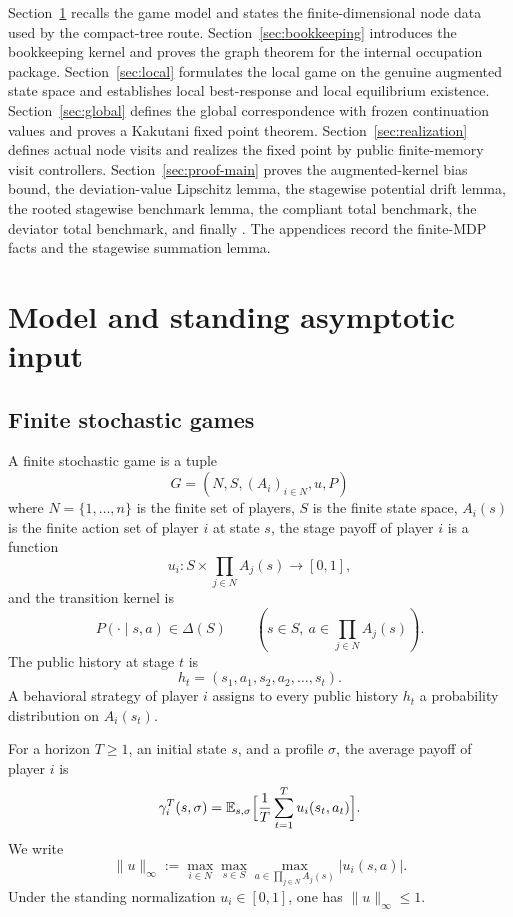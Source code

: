 \documentclass[12pt]{article}
\theoremstyle{definition}
\newcommand{\E}{\mathbb{E}}
\newcommand{\1}{\mathbf{1}}
\begin{document}
Section~\ref{sec:model} recalls the game model and states the finite-dimensional
node data used by the compact-tree route. Section~\ref{sec:bookkeeping}
introduces the bookkeeping kernel and proves the graph theorem for the internal
occupation package. Section~\ref{sec:local} formulates the local game on the
genuine augmented state space and establishes local best-response and local
equilibrium existence. Section~\ref{sec:global} defines the global correspondence
with frozen continuation values and proves a Kakutani fixed point theorem.
Section~\ref{sec:realization} defines actual node visits and realizes the fixed
point by public finite-memory visit controllers. Section~\ref{sec:proof-main}
proves the augmented-kernel bias bound, the deviation-value Lipschitz lemma, the
stagewise potential drift lemma, the rooted stagewise benchmark lemma, the
compliant total benchmark, the deviator total benchmark, and finally
. The appendices record the finite-MDP facts and the stagewise
summation lemma.

\section{Model and standing asymptotic input}
\label{sec:model}

\subsection{Finite stochastic games}

A finite stochastic game is a tuple
\[
G=(N,S,(A_i)_{i\in N},u,P)
\]
where $N=\{1,\dots,n\}$ is the finite set of players, $S$ is the finite state
space, $A_i(s)$ is the finite action set of player $i$ at state $s$, the stage
payoff of player $i$ is a function
\[
u_i:S\times \prod_{j\in N}A_j(s)\to [0,1],
\]
and the transition kernel is
\[
P(\cdot\mid s,a)\in \Delta(S)
\qquad (s\in S,\ a\in \prod_{j\in N}A_j(s)).
\]
The public history at stage $t$ is
\[
h_t=(s_1,a_1,s_2,a_2,\dots,s_t).
\]
A behavioral strategy of player $i$ assigns to every public history $h_t$ a
probability distribution on $A_i(s_t)$.

For a horizon $T\ge 1$, an initial state $s$, and a profile $\sigma$, the average
payoff of player $i$ is
\[
\gamma_i^T(s,\sigma)
=
\E_{s,\sigma}\Bigl[\frac1T\sum_{t=1}^T u_i(s_t,a_t)\Bigr].
\]
We write
\[
\|u\|_\infty
:=
\max_{i\in N}\max_{s\in S}\max_{a\in\prod_{j\in N}A_j(s)} |u_i(s,a)|.
\]
Under the standing normalization $u_i\in[0,1]$, one has $\|u\|_\infty\le 1$.
\end{document}
